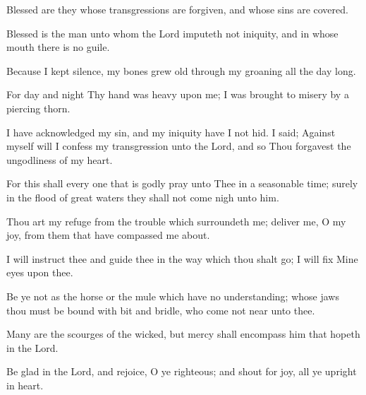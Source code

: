 Blessed are they whose transgressions are forgiven, and whose sins are covered.

Blessed is the man unto whom the Lord imputeth not iniquity, and in whose mouth there is no guile.

Because I kept silence, my bones grew old through my groaning all the day long.

For day and night Thy hand was heavy upon me; I was brought to misery by a piercing thorn.

I have acknowledged my sin, and my iniquity have I not hid. I said; Against myself will I confess my transgression unto the Lord, and so Thou forgavest the ungodliness of my heart.

For this shall every one that is godly pray unto Thee in a seasonable time; surely in the flood of great waters they shall not come nigh unto him.

Thou art my refuge from the trouble which surroundeth me; deliver me, O my joy, from them that have compassed me about.

I will instruct thee and guide thee in the way which thou shalt go; I will fix Mine eyes upon thee.

Be ye not as the horse or the mule which have no understanding; whose jaws thou must be bound with bit and bridle, who come not near unto thee.

Many are the scourges of the wicked, but mercy shall encompass him that hopeth in the Lord.

Be glad in the Lord, and rejoice, O ye righteous; and shout for joy, all ye upright in heart.
